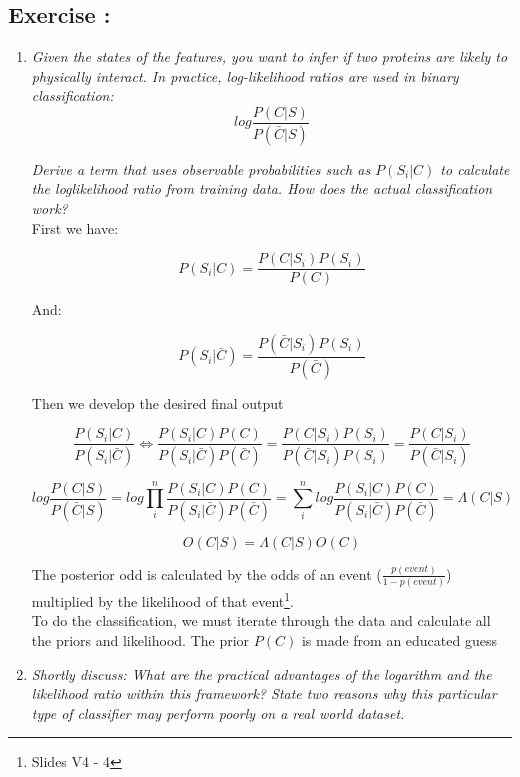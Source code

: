 \documentclass[10pt,a4paper]{article}
\newcommand{\exercise}[1]
{
  \stepcounter{subsection}
  \subsection*{Exercise \thesubsection: #1}

}
\begin{document}
\exercise{}
\begin{enumerate}

\item \textit{Given the states of the features, you want to infer if two proteins are likely to physically
	interact. In practice, log-likelihood ratios are used in binary classification:}\\

\[ 
	log\frac{P(C|S)}{P(\bar{C}|S)} 
\]

\textit{Derive a term that uses observable probabilities such as $ P(S_i|C) $ to calculate the loglikelihood
	ratio from training data. How does the actual classification work?}\\



First we have: 

\[ P(S_i | C) = \frac{P(C|S_i)P(S_i)}{P(C)} \]

And: 

\[ P(S_i | \bar{C}) = \frac{P(\bar{C}|S_i)P(S_i)}{P(\bar{C})} \]

Then we develop the desired final output

\[ \frac{P(S_i|C)}{P(S_i |\bar{C})}  \Longleftrightarrow \frac{P(S_i | C)P(C)}{P(S_i |\bar{C})P(\bar{C})} = \frac{P(C|S_i)P(S_i)}{P(\bar{C}|S_i)P(S_i)} = \frac{P(C|S_i )}{P(\bar{C}|S_i)}\]



\[ log\frac{P(C|S)}{P(\bar{C}|S)} = log \prod_{i}^{n} \frac{P(S_i | C)P(C)}{P(S_i |\bar{C})P(\bar{C})} = \sum_{i}^{n} log \frac{P(S_i | C)P(C)}{P(S_i |\bar{C})P(\bar{C})} = \Lambda(C|S) \]

\[ O(C|S) =  \Lambda(C|S) O(C)\]

The posterior odd is calculated by the odds of an event ($ \frac{p(event)}{1-p(event)}$) multiplied by the likelihood of that event\footnote{Slides V4 - 4}. \\

To do the classification, we must iterate through the data and calculate all the priors and likelihood. The prior $P(C)$ is made from an educated guess 


\item \textit{Shortly discuss: What are the practical advantages of the logarithm and the likelihood ratio
	within this framework? State two reasons why this particular type of classifier may perform
	poorly on a real world dataset.}\\


\end{enumerate}
\end{document}
